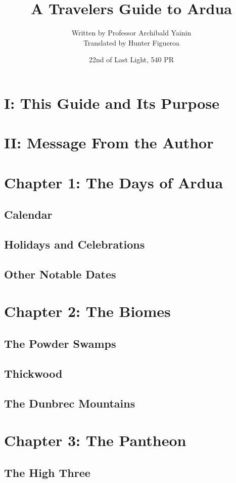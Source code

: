 \documentclass[10pt,twoside,twocolumn,openany]{book}
\title{A Travelers Guide to Ardua}
\date{ 22nd of Last Light, 540 PR}
\author{Written by Professor Archibald Yainin\\ Translated by Hunter Figueroa}
\begin{document}
	
	\selectfont %
	\maketitle
	
	\tableofcontents
	
	
	
	\chapter{I: This Guide and Its Purpose}
	\chapter{II: Message From the Author}
	\chapter{Chapter 1: The Days of Ardua}
		\section{Calendar}
		\section{Holidays and Celebrations}
		\section{Other Notable Dates}
	\chapter{Chapter 2: The Biomes}
		\section{The Powder Swamps}
		\section{Thickwood}
		\section{The Dunbrec Mountains}
	\chapter{Chapter 3: The Pantheon}
		\section{The High Three}
\end{document}
